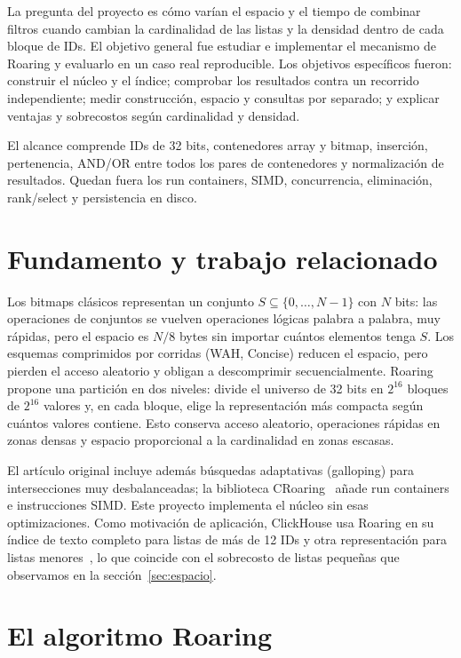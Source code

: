 \documentclass[11pt,a4paper]{article}
\begin{document}
La pregunta del proyecto es cómo varían el espacio y el tiempo de combinar filtros cuando cambian la cardinalidad de las listas y la densidad dentro de cada bloque de IDs. El objetivo general fue estudiar e implementar el mecanismo de Roaring y evaluarlo en un caso real reproducible. Los objetivos específicos fueron: construir el núcleo y el índice; comprobar los resultados contra un recorrido independiente; medir construcción, espacio y consultas por separado; y explicar ventajas y sobrecostos según cardinalidad y densidad.

El alcance comprende IDs de 32 bits, contenedores array y bitmap, inserción, pertenencia, AND/OR entre todos los pares de contenedores y normalización de resultados. Quedan fuera los run containers, SIMD, concurrencia, eliminación, rank/select y persistencia en disco.

\section{Fundamento y trabajo relacionado}
Los bitmaps clásicos representan un conjunto $S\subseteq\{0,\ldots,N-1\}$ con $N$ bits: las operaciones de conjuntos se vuelven operaciones lógicas palabra a palabra, muy rápidas, pero el espacio es $N/8$ bytes sin importar cuántos elementos tenga $S$. Los esquemas comprimidos por corridas (WAH, Concise) reducen el espacio, pero pierden el acceso aleatorio y obligan a descomprimir secuencialmente. Roaring~\cite{chambi2016} propone una partición en dos niveles: divide el universo de 32 bits en $2^{16}$ bloques de $2^{16}$ valores y, en cada bloque, elige la representación más compacta según cuántos valores contiene. Esto conserva acceso aleatorio, operaciones rápidas en zonas densas y espacio proporcional a la cardinalidad en zonas escasas.

El artículo original incluye además búsquedas adaptativas (galloping) para intersecciones muy desbalanceadas; la biblioteca CRoaring~\cite{lemire2018} añade run containers e instrucciones SIMD. Este proyecto implementa el núcleo sin esas optimizaciones. Como motivación de aplicación, ClickHouse usa Roaring en su índice de texto completo para listas de más de 12 IDs y otra representación para listas menores~\cite{clickhouse2026}, lo que coincide con el sobrecosto de listas pequeñas que observamos en la sección~\ref{sec:espacio}.

\section{El algoritmo Roaring}\label{sec:algoritmo}
\end{document}
